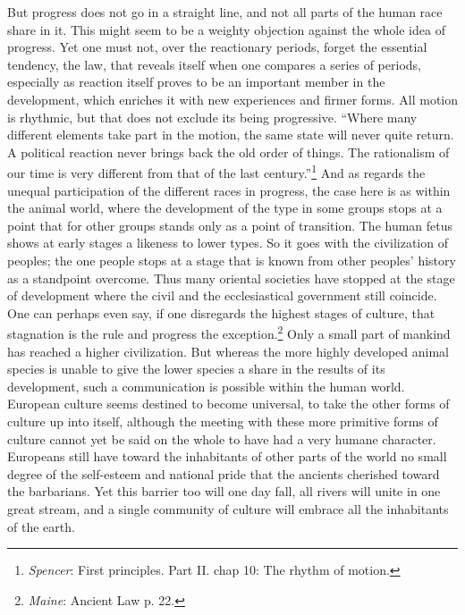 \documentclass[12pt,a4paper,openany]{book}
\newcommand{\opage}[1]{\marginnote{\footnotesize\textit{[#1]}}}
\begin{document}
But progress does not go in a straight line, and not all parts of the
human race share in it. This might seem to be a weighty objection against
the whole idea of progress. Yet one must not, over the reactionary
periods, forget the essential tendency, the law, that reveals itself when
one compares a series of periods, especially as reaction itself proves to
be an important member in the development, which enriches it with new
experiences and firmer forms. All motion is rhythmic, but that does not
exclude its being progressive. ``Where many different
\opage{104}elements take part in the motion, the same state will never
quite return. A political reaction never brings back the old order of
things. The rationalism of our time is very different from that of the
last century.''\footnote[1]{\emph{Spencer}: First principles. Part II.
chap 10: The rhythm of motion.} And as regards the unequal participation
of the different races in progress, the case here is as within the animal
world, where the development of the type in some groups stops at a point
that for other groups stands only as a point of transition. The human
fetus shows at early stages a likeness to lower types. So it goes with
the civilization of peoples; the one people stops at a stage that is known
from other peoples' history as a standpoint overcome. Thus many oriental
societies have stopped at the stage of development where the civil and the
ecclesiastical government still coincide. One can perhaps even say, if one
disregards the highest stages of culture, that stagnation is the rule and
progress the exception.\footnote[2]{\emph{Maine}: Ancient Law p. 22.} Only
a small part of mankind has reached a higher civilization. But whereas the
more highly developed animal species is unable to give the lower species a
share in the results of its development, such a communication is possible
within the human world. European culture seems destined to become
universal, to take the other forms of culture up into itself, although the
meeting with these more primitive forms of culture cannot yet be said
\opage{105}on the whole to have had a very humane character. Europeans
still have toward the inhabitants of other parts of the world no small
degree of the self-esteem and national pride that the ancients cherished
toward the barbarians. Yet this barrier too will one day fall, all rivers
will unite in one great stream, and a single community of culture will
embrace all the inhabitants of the earth.
\end{document}
